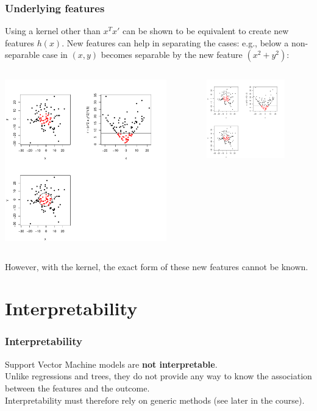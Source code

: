 \begin{frame}
\frametitle{Underlying features}
Using a kernel other than $x^Tx'$ can be shown to be equivalent to create new features $h(x)$. New features can help in separating the cases: e.g., below a non-separable case in $(x,y)$ becomes separable by the new feature $(x^2+y^2)$:\\
\vspace{0.3cm}

\begin{columns}
\begin{column}{0.66\linewidth}
\includegraphics[width=7cm]{../../Graphs/svm_quad.png} 
\end{column}
\begin{column}{0.34\linewidth}
\hspace{-1cm}
\includegraphics[width=3.4cm]{../../Graphs/svm_quad2.png} 
\vspace{0.2cm}
\end{column}
\end{columns}
However, with the kernel, the exact form of these new features cannot be known.
\end{frame}
\section{Interpretability}
\begin{frame}
\frametitle{Interpretability}
Support Vector Machine models are {\bf not interpretable}. \\
\vspace{0.3cm}
Unlike regressions and trees, they do not provide any way to know the association between the features and the outcome.\\
\vspace{0.3cm}
Interpretability must therefore rely on generic methods (see later in the course).
\end{frame}
